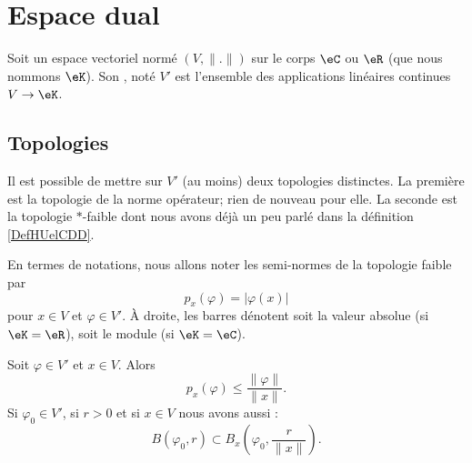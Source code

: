 \section{Espace dual}
\label{SECooKOJNooQVawFY}

\begin{definition}
    Soit un espace vectoriel normé \( (V,\| . \|)\) sur le corps \( \eC\) ou \( \eR\) (que nous nommons \( \eK\)). Son , noté \( V'\) est l'ensemble des applications linéaires continues \( V\to \eK\).
\end{definition}

\subsection{Topologies}

Il est possible de mettre sur \( V'\) (au moins) deux topologies distinctes. La première est la topologie de la norme opérateur; rien de nouveau pour elle. La seconde est la topologie \( *\)-faible dont nous avons déjà un peu parlé dans la définition \ref{DefHUelCDD}.

En termes de notations, nous allons noter les semi-normes de la topologie faible par
\begin{equation}
    p_x(\varphi)=| \varphi(x) |
\end{equation}
pour \( x\in V\) et \( \varphi\in V'\). À droite, les barres dénotent soit la valeur absolue (si \( \eK=\eR\)), soit le module (si \( \eK=\eC\)).

\begin{lemma}       \label{LEMooFMAUooQBIeTh}
    Soit \( \varphi\in V'\) et \( x\in V\). Alors
    \begin{equation}
        p_x(\varphi)\leq\frac{ \| \varphi \| }{ \| x \| }.
    \end{equation}
    Si \( \varphi_0\in V'\), si \( r>0\) et si \( x\in V\) nous avons aussi :
    \begin{equation}
        B(\varphi_0,r)\subset B_x(\varphi_0,\frac{ r }{ \| x \| }).
    \end{equation}
\end{lemma}


